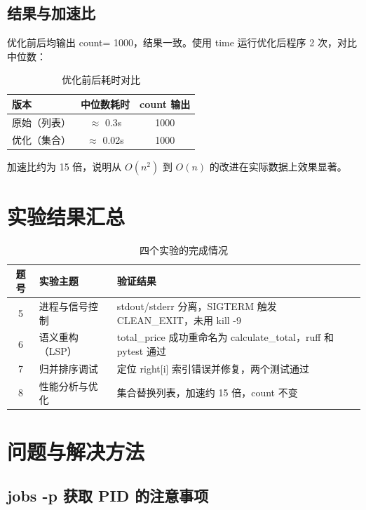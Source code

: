 \documentclass[UTF8]{ctexart}
\begin{document}
\subsection{结果与加速比}

优化前后均输出 count= 1000，结果一致。使用 time 运行优化后程序 2 次，对比中位数：

\begin{table}[htbp]
\centering
\caption{优化前后耗时对比}
\label{tab:profile}
\begin{tabular}{lcc}
\toprule
版本 & 中位数耗时 & count 输出 \\
\midrule
原始（列表） & $\approx$ 0.3s & 1000 \\
优化（集合） & $\approx$ 0.02s & 1000 \\
\bottomrule
\end{tabular}
\end{table}

加速比约为 15 倍，说明从 $O(n^2)$ 到 $O(n)$ 的改进在实际数据上效果显著。

\section{实验结果汇总}

\begin{table}[htbp]
\centering
\caption{四个实验的完成情况}
\label{tab:summary}
\begin{tabular}{cll}
\toprule
题号 & 实验主题 & 验证结果 \\
\midrule
5 & 进程与信号控制 & stdout/stderr 分离，SIGTERM 触发 CLEAN\_EXIT，未用 kill -9 \\
6 & 语义重构（LSP） & total\_price 成功重命名为 calculate\_total，ruff 和 pytest 通过 \\
7 & 归并排序调试 & 定位 right[i] 索引错误并修复，两个测试通过 \\
8 & 性能分析与优化 & 集合替换列表，加速约 15 倍，count 不变 \\
\bottomrule
\end{tabular}
\end{table}

\section{问题与解决方法}

\subsection{jobs -p 获取 PID 的注意事项}
\end{document}
